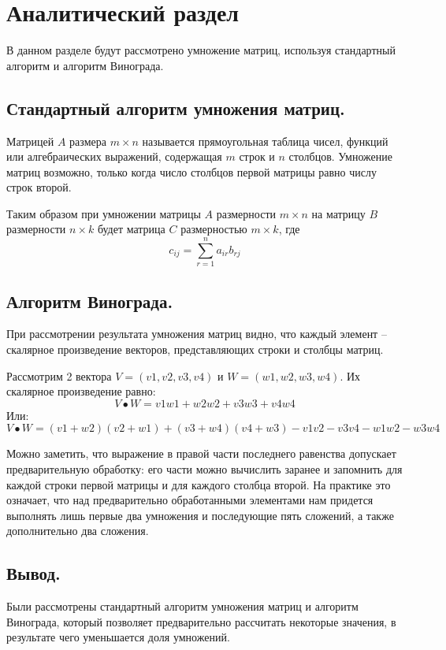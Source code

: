\chapter{Аналитический раздел}
\label{cha:analysis}
В данном разделе будут рассмотрено умножение матриц, используя стандартный алгоритм и алгоритм Винограда.
\section{Стандартный алгоритм умножения матриц.}
Матрицей $A$ размера $m\times n$ называется прямоугольная таблица чисел, функций или алгебраических выражений, содержащая $m$ строк и $n$ столбцов. \cite{Belousov} Умножение матриц возможно, только когда число столбцов первой матрицы равно числу строк второй.
\par Таким образом при умножении матрицы $A$ размерности $m \times n$ на матрицу $B$ размерности $n \times k$ будет матрица $C$ размерностью $m \times k$, где
\begin{equation}
	c_{ij} = \sum\limits_{r=1}^{n}a_{ir}b_{rj}
\end{equation}


\section{Алгоритм Винограда.}
При рассмотрении результата умножения матриц видно, что каждый элемент -- скалярное произведение векторов, представляющих строки и столбцы матриц. \cite{Algolib}
\par Рассмотрим 2 вектора $V = (v1, v2, v3, v4)$ и $W =(w1,w2,w3,w4)$. Их скалярное произведение равно:
\begin{equation}
V\bullet W=v1w1+w2w2+v3w3+v4w4
\end{equation}
Или:
\begin{equation}
V\bullet W=(v1+w2)(v2+w1)+(v3+w4)(v4+w3)-v1v2-v3v4-w1w2-w3w4
\end{equation}
\par Можно заметить, что выражение в правой части последнего равенства допускает предварительную обработку: его части можно вычислить заранее и запомнить для каждой строки первой матрицы и для каждого столбца второй. На практике это означает, что над предварительно обработанными элементами нам придется выполнять лишь первые два умножения и последующие пять сложений, а также дополнительно два сложения.
\section{Вывод.} 
Были рассмотрены стандартный алгоритм умножения матриц и алгоритм Винограда, который позволяет предварительно рассчитать некоторые значения, в результате чего уменьшается доля умножений.